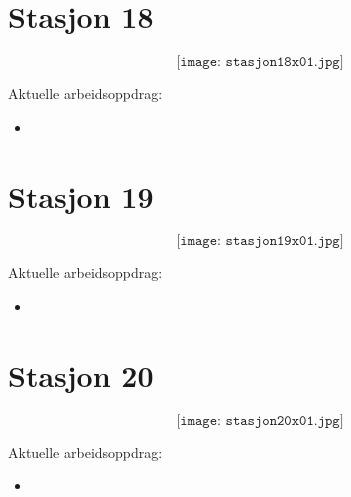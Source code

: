 \section{Stasjon 18}

$$\texttt{[image: stasjon18x01.jpg]}$$

Aktuelle arbeidsoppdrag:\\
\begin{itemize}[noitemsep]
	\item 
\end{itemize}

\section{Stasjon 19}

$$\texttt{[image: stasjon19x01.jpg]}$$

Aktuelle arbeidsoppdrag:\\
\begin{itemize}[noitemsep]
	\item 
\end{itemize}


\section{Stasjon 20}

$$\texttt{[image: stasjon20x01.jpg]}$$

Aktuelle arbeidsoppdrag:\\
\begin{itemize}[noitemsep]
	\item 
\end{itemize}











































